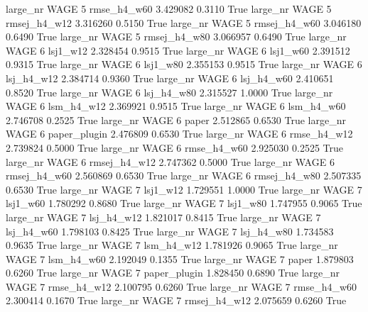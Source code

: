   large_nr     WAGE                 5  rmse_h4_w60    3.429082      0.3110    True
  large_nr     WAGE                 5 rmsej_h4_w12    3.316260      0.5150    True
  large_nr     WAGE                 5 rmsej_h4_w60    3.046180      0.6490    True
  large_nr     WAGE                 5 rmsej_h4_w80    3.066957      0.6490    True
  large_nr     WAGE                 6     lsj1_w12    2.328454      0.9515    True
  large_nr     WAGE                 6     lsj1_w60    2.391512      0.9315    True
  large_nr     WAGE                 6     lsj1_w80    2.355153      0.9515    True
  large_nr     WAGE                 6   lsj_h4_w12    2.384714      0.9360    True
  large_nr     WAGE                 6   lsj_h4_w60    2.410651      0.8520    True
  large_nr     WAGE                 6   lsj_h4_w80    2.315527      1.0000    True
  large_nr     WAGE                 6   lsm_h4_w12    2.369921      0.9515    True
  large_nr     WAGE                 6   lsm_h4_w60    2.746708      0.2525    True
  large_nr     WAGE                 6        paper    2.512865      0.6530    True
  large_nr     WAGE                 6 paper_plugin    2.476809      0.6530    True
  large_nr     WAGE                 6  rmse_h4_w12    2.739824      0.5000    True
  large_nr     WAGE                 6  rmse_h4_w60    2.925030      0.2525    True
  large_nr     WAGE                 6 rmsej_h4_w12    2.747362      0.5000    True
  large_nr     WAGE                 6 rmsej_h4_w60    2.560869      0.6530    True
  large_nr     WAGE                 6 rmsej_h4_w80    2.507335      0.6530    True
  large_nr     WAGE                 7     lsj1_w12    1.729551      1.0000    True
  large_nr     WAGE                 7     lsj1_w60    1.780292      0.8680    True
  large_nr     WAGE                 7     lsj1_w80    1.747955      0.9065    True
  large_nr     WAGE                 7   lsj_h4_w12    1.821017      0.8415    True
  large_nr     WAGE                 7   lsj_h4_w60    1.798103      0.8425    True
  large_nr     WAGE                 7   lsj_h4_w80    1.734583      0.9635    True
  large_nr     WAGE                 7   lsm_h4_w12    1.781926      0.9065    True
  large_nr     WAGE                 7   lsm_h4_w60    2.192049      0.1355    True
  large_nr     WAGE                 7        paper    1.879803      0.6260    True
  large_nr     WAGE                 7 paper_plugin    1.828450      0.6890    True
  large_nr     WAGE                 7  rmse_h4_w12    2.100795      0.6260    True
  large_nr     WAGE                 7  rmse_h4_w60    2.300414      0.1670    True
  large_nr     WAGE                 7 rmsej_h4_w12    2.075659      0.6260    True
